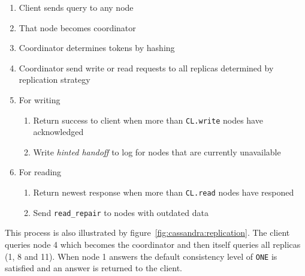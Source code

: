\begin{enumerate}
  \item Client sends query to any node
  \item That node becomes coordinator
  \item Coordinator determines tokens by hashing
  \item Coordinator send write or read requests to all replicas determined by replication strategy
  \item For writing
    \begin{enumerate}
      \item Return success to client when more than \texttt{CL.write} nodes have acknowledged
      \item Write \textit{hinted handoff} to log for nodes that are currently unavailable
    \end{enumerate}
  \addtocounter{enumi}{-1}  %
  \item For reading
    \begin{enumerate}
      \item Return newest response when more than \texttt{CL.read} nodes have responed
      \item Send \texttt{read\_repair} to nodes with outdated data
    \end{enumerate}
\end{enumerate}

This process is also illustrated by figure~\ref{fig:cassandra:replication}.
The client queries node 4 which becomes the coordinator and then itself queries all replicas (1, 8 and 11).
When node 1 answers the default consistency level of \texttt{ONE} is satisfied and an answer is returned to the client.

